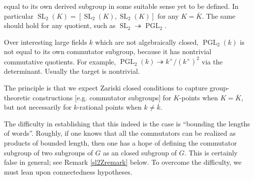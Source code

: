 \documentclass[10pt]{article}
\newcommand{\PGL}{\operatorname{PGL}}
\newcommand{\SL}{\operatorname{SL}}
\renewcommand{\(}{\left(}
\renewcommand{\)}{\right)}
\renewcommand{\bar}{\overline}
\newcommand{\onto}{\twoheadrightarrow }
\numberwithin{thm}{subsection}
\begin{document}
equal to its own derived subgroup in some suitable sense yet to be defined.
In particular $\SL_2(K)=[\SL_2(K),\SL_2(K)]$ for any $K=\bar K$.
The same should hold for any quotient,
such as $\SL_2\onto \PGL_2$.
\begin{rem}
Over interesting large fields $k$ which are not algebraically closed,
$\PGL_2(k)$ is not equal to its own commutator subgroup,
because it has nontrivial commutative quotients.
For example, $\PGL_2(k)\onto k^\times/(k^\times)^2$
via the determinant. Usually the target is nontrivial.
\end{rem}
The principle is that we expect Zariski closed conditions to capture
group-theoretic constructions [e.g. commutator subgroups]
for $K$-points when $K=\bar K$,
but not necessarily for $k$-rational points
when $k\neq \bar k$.

The difficulty in establishing that this indeed is the case is ``bounding the lengths of words''. Roughly, if one knows that all the commutators
can be realized as products of bounded length, then one has a hope
of defining the commutator subgroup of two subgroups of $G$
as an closed subgroup of $G$.
This is certainly false in general;
see Remark \ref{sl2Zremark} below.
To overcome the difficulty, we must lean upon connectedness hypotheses.
\end{document}
